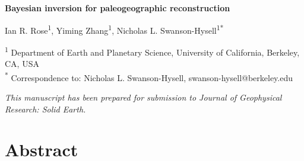 \documentclass[11pt,letterpaper]{article}
\begin{document}
\begin{flushleft}
{\Large \textbf{Bayesian inversion for paleogeographic reconstruction}}

Ian R. Rose\textsuperscript{1},
Yiming Zhang\textsuperscript{1},
Nicholas L. Swanson-Hysell\textsuperscript{1}\textsuperscript{*}

\bigskip
\textsuperscript{1} Department of Earth and Planetary Science, University of California, Berkeley, CA, USA\\
\textsuperscript{*} Correspondence to: Nicholas L. Swanson-Hysell, swanson-hysell@berkeley.edu
\bigskip

\end{flushleft}

\noindent\textit{This manuscript has been prepared for submission to Journal of Geophysical Research: Solid Earth.}

\linenumbers

\section*{Abstract \label{sec:ABSTRACT}}
\end{document}
